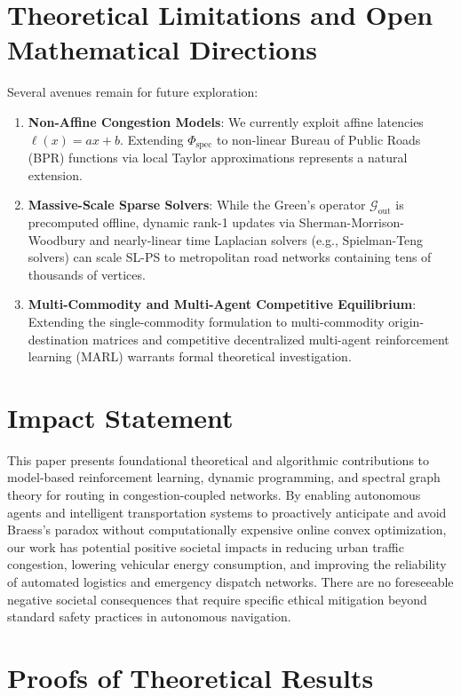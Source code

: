 \documentclass[11pt,a4paper]{article}
\begin{document}
\section{Theoretical Limitations and Open Mathematical Directions}
\label{sec:limitations}

Several avenues remain for future exploration:
\begin{enumerate}
    \item \textbf{Non-Affine Congestion Models}: We currently exploit affine latencies $\ell(x) = ax + b$. Extending $\Phi_{\text{spec}}$ to non-linear Bureau of Public Roads (BPR) functions via local Taylor approximations represents a natural extension.
    \item \textbf{Massive-Scale Sparse Solvers}: While the Green's operator $\mathcal{G}_{\text{out}}$ is precomputed offline, dynamic rank-1 updates via Sherman-Morrison-Woodbury and nearly-linear time Laplacian solvers (e.g., Spielman-Teng solvers) can scale SL-PS to metropolitan road networks containing tens of thousands of vertices.
    \item \textbf{Multi-Commodity and Multi-Agent Competitive Equilibrium}: Extending the single-commodity formulation to multi-commodity origin-destination matrices and competitive decentralized multi-agent reinforcement learning (MARL) warrants formal theoretical investigation.
\end{enumerate}

\section*{Impact Statement}
This paper presents foundational theoretical and algorithmic contributions to model-based reinforcement learning, dynamic programming, and spectral graph theory for routing in congestion-coupled networks. By enabling autonomous agents and intelligent transportation systems to proactively anticipate and avoid Braess's paradox without computationally expensive online convex optimization, our work has potential positive societal impacts in reducing urban traffic congestion, lowering vehicular energy consumption, and improving the reliability of automated logistics and emergency dispatch networks. There are no foreseeable negative societal consequences that require specific ethical mitigation beyond standard safety practices in autonomous navigation.

\clearpage
\appendix

\section{Proofs of Theoretical Results}
\label{sec:appendix_proofs}
\end{document}
